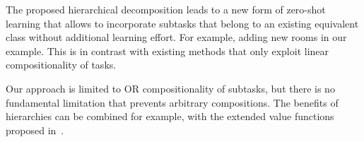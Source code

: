The proposed hierarchical decomposition leads to a new form of zero-shot learning that allows to incorporate subtasks that belong to an existing equivalent class without additional learning effort.
For example, adding new rooms in our example.
This is in contrast with existing methods that only exploit linear compositionality of tasks.

Our approach is limited to OR compositionality of subtasks, but there is no fundamental limitation that prevents arbitrary compositions.
The benefits of hierarchies can be combined for example, with the extended value functions proposed in~\citep{NangueTasse2020}.